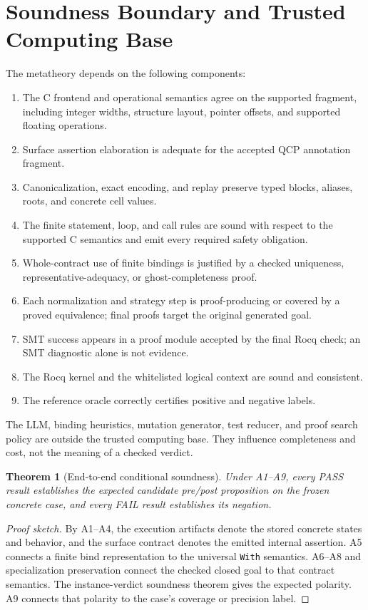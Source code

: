 \documentclass[10pt]{article}
\newtheorem{theorem}{Theorem}
\newcommand{\rocq}{Rocq}
\newcommand{\pass}{\textsf{PASS}}
\newcommand{\fail}{\textsf{FAIL}}
\begin{document}
\section{Soundness Boundary and Trusted Computing Base}
\label{sec:tcb}

The metatheory depends on the following components:

\begin{enumerate}[leftmargin=1.4em,label=A\arabic*.]
  \item The C frontend and operational semantics agree on the supported
        fragment, including integer widths, structure layout, pointer offsets,
        and supported floating operations.
  \item Surface assertion elaboration is adequate for the accepted QCP
        annotation fragment.
  \item Canonicalization, exact encoding, and replay preserve typed blocks,
        aliases, roots, and concrete cell values.
  \item The finite statement, loop, and call rules are sound with respect to
        the supported C semantics and emit every required safety obligation.
  \item Whole-contract use of finite bindings is justified by a checked
        uniqueness, representative-adequacy, or ghost-completeness proof.
  \item Each normalization and strategy step is proof-producing or covered by
        a proved equivalence; final proofs target the original generated goal.
  \item SMT success appears in a proof module accepted by the final \rocq{}
        check; an SMT diagnostic alone is not evidence.
  \item The \rocq{} kernel and the whitelisted logical context are sound and
        consistent.
  \item The reference oracle correctly certifies positive and negative labels.
\end{enumerate}

The LLM, binding heuristics, mutation generator, test reducer, and proof search
policy are outside the trusted computing base.  They influence completeness
and cost, not the meaning of a checked verdict.

\begin{theorem}[End-to-end conditional soundness]
Under A1--A9, every \pass{} result establishes the expected candidate
pre/post proposition on the frozen concrete case, and every \fail{} result
establishes its negation.
\end{theorem}
\begin{proof}[Proof sketch]
By A1--A4, the execution artifacts denote the stored concrete states and
behavior, and the surface contract denotes the emitted internal assertion.
A5 connects a finite bind representation to the universal \texttt{With}
semantics.  A6--A8 and specialization preservation connect the checked closed
goal to that contract semantics.  The instance-verdict soundness theorem gives
the expected polarity.  A9 connects that polarity to the case's coverage or
precision label.
\end{proof}
\end{document}
